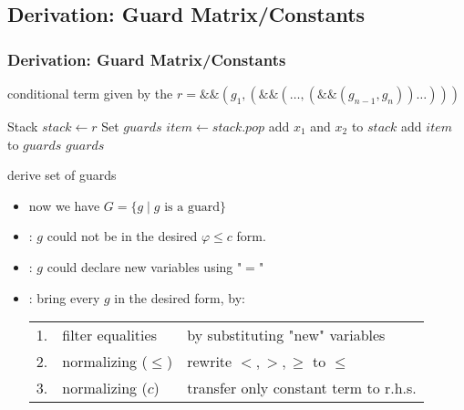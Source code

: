 \subsection{Derivation: Guard Matrix/Constants}
\begin{frame}
	\frametitle{Derivation: Guard Matrix/Constants}
	conditional term given by the \seg \newline
	\hspace*{1.5cm}$r = \&\&(g_1,( \&\& (\dots,(\&\&(g_{n-1},g_n) )\dots)))$
	\begin{algorithm}[H]
		\begin{algorithmic}[1]
			\State Stack $stack \gets r$
			\State Set $guards$
			\State $item \gets stack.pop$
			\State add $x_1$ and $x_2$ to $stack$
			\Else
			\State add $item$ to $guards$
			\EndIf				
			\EndWhile	
			\State \Return $guards$
			\EndFunction
		\end{algorithmic}
		\caption{derive set of guards}
	\end{algorithm}
\end{frame}	
	
\begin{frame}
	\begin{itemize}
		\item now we have $G=\{g \mid g \text{ is a guard}\}$
		\item {}: $g$ could not be in the desired $\varphi \le c$ form.
		\item {}: $g$ could declare new variables using "$=$"
		\item {}: bring every $g$ in the desired form, by: 
			\begin{tabular}{cll}
				1. & filter equalities   & by substituting "new" variables \\
				2. & normalizing ($\le$) & rewrite $<,>,\ge$ to $\le$ \\
				3. & normalizing ($c$)   & transfer only constant term to r.h.s.\\
			\end{tabular}
	\end{itemize}	
\end{frame}

